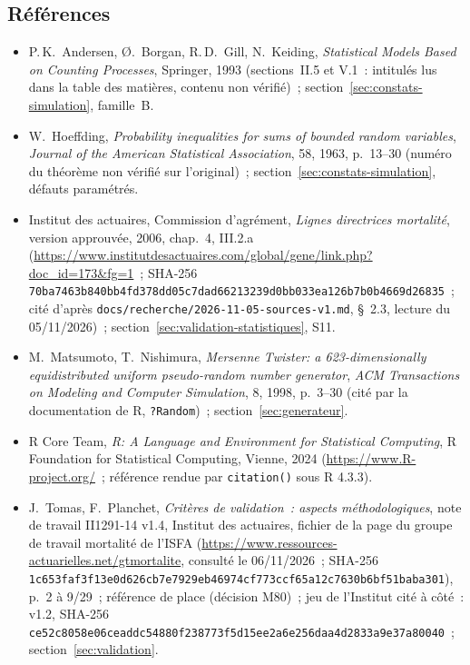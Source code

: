 \documentclass[a4paper,11pt]{article}
\newcommand{\code}[1]{\texttt{\small #1}}
\begin{document}
\subsection{Références}
\label{sec:references}

\begin{itemize}[leftmargin=*, itemsep=3pt]
  \item P.\,K.~Andersen, Ø.~Borgan, R.\,D.~Gill, N.~Keiding,
    \emph{Statistical Models Based on Counting Processes}, Springer, 1993
    (sections~II.5 et V.1~: intitulés lus dans la table des matières,
    contenu non vérifié)~; section~\ref{sec:constats-simulation}, famille~B.
  \item W.~Hoeffding, \emph{Probability inequalities for sums of bounded
    random variables}, \emph{Journal of the American Statistical
    Association}, 58, 1963, p.~13--30 (numéro du théorème non vérifié sur
    l'original)~; section~\ref{sec:constats-simulation}, défauts
    paramétrés.
  \item {\sloppy Institut des actuaires, Commission d'agrément, \emph{Lignes
    directrices mortalité}, version approuvée, 2006, chap.~4, III.2.a
    (\url{https://www.institutdesactuaires.com/global/gene/link.php?doc_id=173&fg=1}~;
    SHA-256 \code{70ba7463b840bb4fd378dd05c7dad662}\allowbreak\code{13239d0bb033ea126b7b0b4669d26835}~;
    cité d'après \code{docs/recherche/}\allowbreak\code{2026-11-05-sources-v1.md},
    §~2.3, lecture du 05/11/2026)~; section~\ref{sec:validation-statistiques},
    S11.\par}
  \item M.~Matsumoto, T.~Nishimura, \emph{Mersenne Twister: a
    623-dimensionally equidistributed uniform pseudo-random number generator},
    \emph{ACM Transactions on Modeling and Computer Simulation}, 8, 1998,
    p.~3--30 (cité par la documentation de R, \code{?Random})~;
    section~\ref{sec:generateur}.
  \item R Core Team, \emph{R: A Language and Environment for Statistical
    Computing}, R Foundation for Statistical Computing, Vienne, 2024
    (\url{https://www.R-project.org/}~; référence rendue par
    \code{citation()} sous R 4.3.3).
  \item {\sloppy J.~Tomas, F.~Planchet, \emph{Critères de validation~: aspects
    méthodologiques}, note de travail II1291-14 v1.4, Institut des
    actuaires, fichier de la page du groupe de travail mortalité de l'ISFA
    (\url{https://www.ressources-actuarielles.net/gtmortalite}, consulté le
    06/11/2026~; SHA-256 \code{1c653faf3f13e0d626cb7e7929eb4697}\allowbreak\code{4cf773ccf65a12c7630b6bf51baba301}), p.~2 à 9/29~; référence de place
    (décision M80)~; jeu de l'Institut cité à côté~: v1.2, SHA-256
    \code{ce52c8058e06ceaddc54880f238773f5}\allowbreak\code{d15ee2a6e256daa4d2833a9e37a80040}~; section~\ref{sec:validation}.\par}
\end{itemize}
\end{document}
